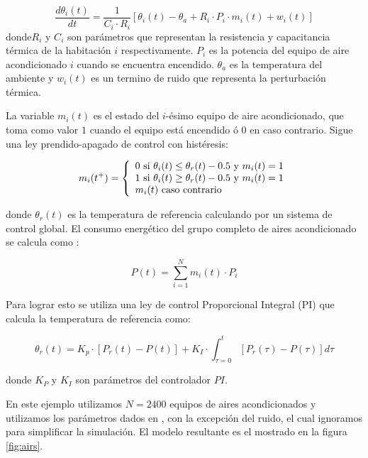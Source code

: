 \documentclass[a4paper,	11pt]{report}
\begin{document}
\begin{equation*}
\frac{d\theta_i(t)}{dt} = \frac{1}{C_i \cdot R_i } [ \theta_i(t) - \theta_a + R_i \cdot P_i \cdot m_i(t) + w_i(t) ]
\end{equation*}
donde$R_i$ y $C_i$ son parámetros que representan la resistencia y capacitancia térmica de la habitación $i$ respectivamente. $P_i$ es la potencia del equipo de aire acondicionado $i$ cuando se encuentra encendido. $\theta_a$ es la temperatura del ambiente y $w_i(t)$ es un termino de ruido que representa la perturbación térmica.

La variable $m_i (t)$ es el estado del $i$-ésimo equipo de aire acondicionado, que toma como valor $1$ cuando el equipo está encendido ó $0$ en caso contrario. Sigue una ley prendido-apagado de control con histéresis:

\begin{equation}
m_i(t^{+}) = \left\{ 
  \begin{array}{l l}
    0 \text{ si } \theta_i(t) \leq \theta_r(t) - 0.5 \text{ y } m_i(t)=1 \\
    1 \text{ si } \theta_i(t) \geq \theta_r(t) - 0.5 \text{ y } m_i(t)=1 \\
    m_i (t) \text{ caso contrario } 
  \end{array} \right.
\end{equation}

donde $\theta_r(t)$ es la temperatura de referencia calculando por un sistema de control global.
El consumo energético del grupo completo de aires acondicionado se calcula como :

\begin{equation*}
P(t) = \sum_{i=1}^{N}  m_i(t) \cdot P_i
\end{equation*}

Para lograr esto se utiliza una ley de control Proporcional Integral (PI) que calcula la temperatura de referencia como:

\begin{equation*}
\theta_r(t) = K_p \cdot [P_r(t) - P(t)] + K_I \cdot \int_{\tau = 0}^t [P_r(\tau) - P(\tau)] d\tau
\end{equation*}

donde $K_P$ y $K_I$ son parámetros del controlador $PI$.

En este ejemplo utilizamos $N = 2400$ equipos de aires acondicionados y utilizamos los parámetros dados en \cite{PKBW12}, con la excepción del ruido, el cual ignoramos para simplificar la simulación. El modelo resultante es el mostrado en la figura \ref{fig:airs}.
\end{document}
